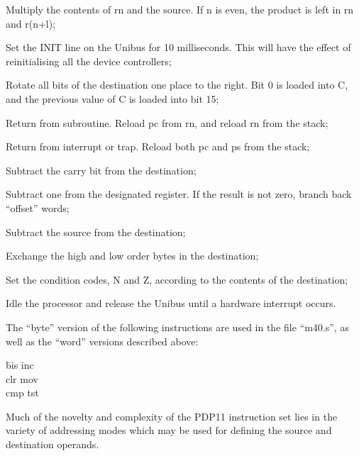 \item[mul] Multiply the contents of rn and
the source. If n is even, the product
is left in rn and r(n+l);


\item[reset] Set the INIT line on the Unibus
for 10 milliseconds. This will
have the effect of reinitialising
all the device controllers;


\item[ror] Rotate all bits of the destination
one place to the right. Bit 0 is
loaded into C, and the previous
value of C is loaded into bit 15;


\item[rts] Return from subroutine. Reload pc
from rn, and reload rn from the
stack;


\item[rtt] Return from interrupt or trap.
Reload both pc and ps from the
stack;

\item[sbc] Subtract the carry bit from
the destination;


\item[sob] Subtract one from the designated
register. If the result is not
zero, branch back ``offset'' words;


\item[sub] Subtract the source from the destination;


\item[swab] Exchange the high and low order
bytes in the destination;


\item[tst] Set the condition codes, N and Z,
according to the contents of the
destination;


\item[wait] Idle the processor and release the
Unibus until a hardware interrupt
occurs.
\ed

The ``byte'' version of the following
instructions are used in the file
``m40.s'', as well as the ``word'' versions
described above:

\bt
\hspace{2cm} \= bis \hspace{2cm} \= inc \\
\> clr \> mov \\
\> cmp \> tst \\
\et



Much of the novelty and complexity of
the PDP11 instruction set lies in the
variety of addressing modes which may
be used for defining the source and
destination operands.


